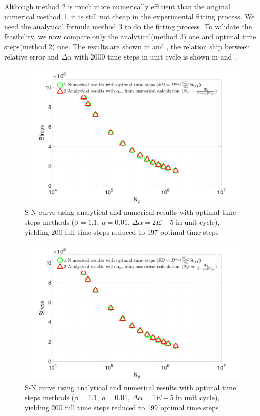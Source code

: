 Although method 2 is much more numerically efficient than the original numerical method 1, it is still not cheap in the experimental fitting process. We need the analytical formula method 3 to do the fitting process. To validate the feasibility, we now compare only the analytical(method 3) one and optimal time steps(method 2) one. The results are shown in  and , the relation ship between relative error and $\Delta \alpha$ with 2000 time steps in unit cycle is shown in   and .
\begin{figure}[!h]
	\centering
	\includegraphics[width=\textwidth]{figures//SN_opt_ana_200_delta_alp=0.00002.png} 
	\caption{S-N curve using analytical and numerical results with optimal time steps methods ($\beta=1.1$, $a=0.01$, $\Delta \alpha=2E-5$ in unit cycle), yielding 200 full time steps reduced to 197 optimal time steps}
	\label{fig.SNnumerical2methods}
\end{figure}
\begin{figure}[!h]
	\centering
	\includegraphics[width=\textwidth]{figures//SN_opt_ana_200_delta_alp=0.00001.png} 
	\caption{S-N curve using analytical and numerical results with optimal time steps methods ($\beta=1.1$, $a=0.01$, $\Delta \alpha=1E-5$ in unit cycle), yielding 200 full time steps reduced to 199 optimal time steps}
	\label{fig.SNnumerical2methods2}
\end{figure}

